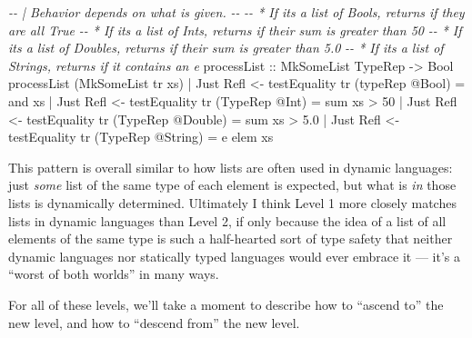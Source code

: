\documentclass[]{article}
\newenvironment{Shaded}{}{}
\newcommand{\CharTok}[1]{\textcolor[rgb]{0.25,0.44,0.63}{#1}}
\newcommand{\CommentTok}[1]{\textcolor[rgb]{0.38,0.63,0.69}{\textit{#1}}}
\newcommand{\DataTypeTok}[1]{\textcolor[rgb]{0.56,0.13,0.00}{#1}}
\newcommand{\DecValTok}[1]{\textcolor[rgb]{0.25,0.63,0.44}{#1}}
\newcommand{\FloatTok}[1]{\textcolor[rgb]{0.25,0.63,0.44}{#1}}
\newcommand{\FunctionTok}[1]{\textcolor[rgb]{0.02,0.16,0.49}{#1}}
\newcommand{\NormalTok}[1]{#1}
\newcommand{\OperatorTok}[1]{\textcolor[rgb]{0.40,0.40,0.40}{#1}}
\newcommand{\OtherTok}[1]{\textcolor[rgb]{0.00,0.44,0.13}{#1}}
\begin{document}
\begin{Shaded}
\begin{Highlighting}[]
\CommentTok{{-}{-} | Behavior depends on what is given.}
\CommentTok{{-}{-}}
\CommentTok{{-}{-} * If it\textquotesingle{}s a list of Bools, returns if they are all True}
\CommentTok{{-}{-} * If it\textquotesingle{}s a list of Ints, returns if their sum is greater than 50}
\CommentTok{{-}{-} * If it\textquotesingle{}s a list of Doubles, returns if their sum is greater than 5.0}
\CommentTok{{-}{-} * If it\textquotesingle{}s a list of Strings, returns if it contains an \textquotesingle{}e\textquotesingle{}}
\OtherTok{processList ::} \DataTypeTok{MkSomeList} \DataTypeTok{TypeRep} \OtherTok{{-}>} \DataTypeTok{Bool}
\NormalTok{processList (}\DataTypeTok{MkSomeList}\NormalTok{ tr xs)}
    \OperatorTok{|} \DataTypeTok{Just} \DataTypeTok{Refl} \OtherTok{<{-}}\NormalTok{ testEquality tr (typeRep }\OperatorTok{@}\DataTypeTok{Bool}\NormalTok{)   }\OtherTok{=} \FunctionTok{and}\NormalTok{ xs}
    \OperatorTok{|} \DataTypeTok{Just} \DataTypeTok{Refl} \OtherTok{<{-}}\NormalTok{ testEquality tr (}\DataTypeTok{TypeRep} \OperatorTok{@}\DataTypeTok{Int}\NormalTok{)    }\OtherTok{=} \FunctionTok{sum}\NormalTok{ xs }\OperatorTok{>} \DecValTok{50}
    \OperatorTok{|} \DataTypeTok{Just} \DataTypeTok{Refl} \OtherTok{<{-}}\NormalTok{ testEquality tr (}\DataTypeTok{TypeRep} \OperatorTok{@}\DataTypeTok{Double}\NormalTok{) }\OtherTok{=} \FunctionTok{sum}\NormalTok{ xs }\OperatorTok{>} \FloatTok{5.0}
    \OperatorTok{|} \DataTypeTok{Just} \DataTypeTok{Refl} \OtherTok{<{-}}\NormalTok{ testEquality tr (}\DataTypeTok{TypeRep} \OperatorTok{@}\DataTypeTok{String}\NormalTok{) }\OtherTok{=} \CharTok{\textquotesingle{}e\textquotesingle{}} \OtherTok{\textasciigrave{}elem\textasciigrave{}}\NormalTok{ xs}
\end{Highlighting}
\end{Shaded}

This pattern is overall similar to how lists are often used in dynamic
languages: just \emph{some} list of the same type of each element is expected,
but what is \emph{in} those lists is dynamically determined. Ultimately I think
Level 1 more closely matches lists in dynamic languages than Level 2, if only
because the idea of a list of all elements of the same type is such a
half-hearted sort of type safety that neither dynamic languages nor statically
typed languages would ever embrace it --- it's a ``worst of both worlds'' in
many ways.

For all of these levels, we'll take a moment to describe how to ``ascend to''
the new level, and how to ``descend from'' the new level.
\end{document}
